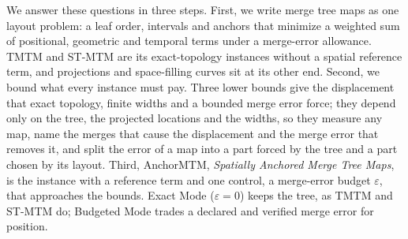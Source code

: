 We answer these questions in three steps. First, we write merge tree maps as one layout problem: a leaf order, intervals and anchors that minimize a weighted sum of positional, geometric and temporal terms under a merge-error allowance. TMTM and ST-MTM are its exact-topology instances without a spatial reference term, and projections and space-filling curves sit at its other end. Second, we bound what every instance must pay. Three lower bounds give the displacement that exact topology, finite widths and a bounded merge error force; they depend only on the tree, the projected locations and the widths, so they measure any map, name the merges that cause the displacement and the merge error that removes it, and split the error of a map into a part forced by the tree and a part chosen by its layout. Third, AnchorMTM, \emph{Spatially Anchored Merge Tree Maps}, is the instance with a reference term and one control, a merge-error budget $\varepsilon$, that approaches the bounds. Exact Mode ($\varepsilon=0$) keeps the tree, as TMTM and ST-MTM do; Budgeted Mode trades a declared and verified merge error for position.

